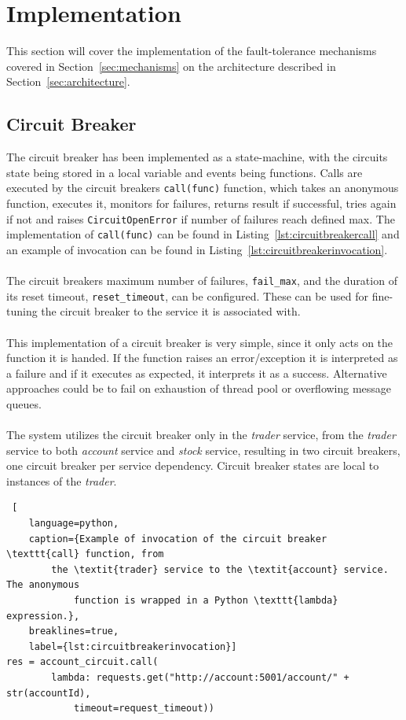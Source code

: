 \section{Implementation}\label{sec:implementation}
This section will cover the implementation of the fault-tolerance mechanisms
covered in Section~\ref{sec:mechanisms} on the architecture described in
Section~\ref{sec:architecture}.

\subsection{Circuit Breaker}
The circuit breaker has been implemented as a state-machine, with the
circuits state being stored in a local variable and events being functions.
Calls are executed by the circuit breakers \texttt{call(func)} function, which takes
an anonymous function, executes it, monitors for failures, returns result if
successful, tries again if not and raises \texttt{CircuitOpenError} if number of
failures reach defined max. The implementation of \texttt{call(func)} can be found in
Listing~\ref{lst:circuitbreakercall} and an example of invocation can be found
in Listing~\ref{lst:circuitbreakerinvocation}.
\\\\
The circuit breakers maximum number of failures, \texttt{fail\_max}, and the duration
of its reset timeout, \texttt{reset\_timeout}, can be configured. These can be used for
fine-tuning the circuit breaker to the service it is associated with. 
\\\\
This implementation of a circuit breaker is very simple, since it only acts on
the function it is handed. If the function raises an error/exception it is
interpreted as a failure and if it executes as expected, it interprets it as a
success. Alternative approaches could be to fail on exhaustion of thread pool
or overflowing message queues.
\\\\
The system utilizes the circuit breaker only in the \textit{trader} service,
from the \textit{trader} service to both \textit{account} service and 
\textit{stock} service, resulting in two circuit breakers, one circuit breaker
per service dependency. Circuit breaker states are local to instances of the 
\textit{trader}.

\begin{lstlisting} [
	language=python,
	caption={Example of invocation of the circuit breaker \texttt{call} function, from
		the \textit{trader} service to the \textit{account} service. The anonymous
			function is wrapped in a Python \texttt{lambda} expression.},
	breaklines=true,
	label={lst:circuitbreakerinvocation}]
res = account_circuit.call(
		lambda: requests.get("http://account:5001/account/" + str(accountId),
			timeout=request_timeout))
\end{lstlisting}

